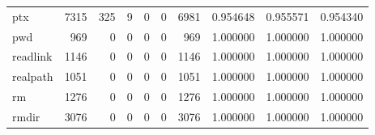 \begin{longtable}{lrrrrrrrrr}
ptx       &                                7315 &                                             325 &                                              9 &                                             0 &                                              0 &                                         6981 &                                           0.954648 &                               0.955571 &                             0.954340 \\
pwd       &                                 969 &                                               0 &                                              0 &                                             0 &                                              0 &                                          969 &                                           1.000000 &                               1.000000 &                             1.000000 \\
readlink  &                                1146 &                                               0 &                                              0 &                                             0 &                                              0 &                                         1146 &                                           1.000000 &                               1.000000 &                             1.000000 \\
realpath  &                                1051 &                                               0 &                                              0 &                                             0 &                                              0 &                                         1051 &                                           1.000000 &                               1.000000 &                             1.000000 \\
rm        &                                1276 &                                               0 &                                              0 &                                             0 &                                              0 &                                         1276 &                                           1.000000 &                               1.000000 &                             1.000000 \\
rmdir     &                                3076 &                                               0 &                                              0 &                                             0 &                                              0 &                                         3076 &                                           1.000000 &                               1.000000 &                             1.000000 \\

\end{longtable}
